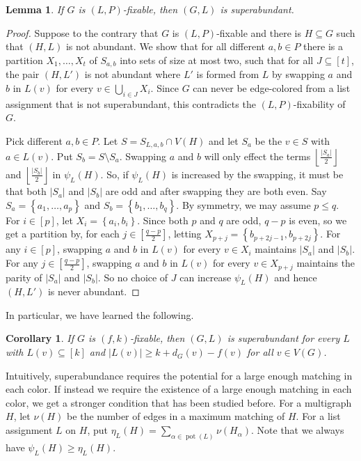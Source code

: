 \documentclass[12pt]{article}
\theoremstyle{plain}
\newtheorem{lem}[thm]{Lemma}
\newtheorem{cor}[thm]{Corollary}
\theoremstyle{definition}
\theoremstyle{remark}
\newcommand{\set}[1]{\left\{ #1 \right\}}
\newcommand{\card}[1]{\left|#1\right|}
\newcommand{\floor}[1]{\left\lfloor#1\right\rfloor}
\newcommand{\irange}[1]{\left[#1\right]}
\newcommand{\pot}{\operatorname{pot}}
\begin{document}
\begin{lem}\label{SuperabundanceIsNecessary}
If $G$ is $(L, P)$-fixable, then $(G, L)$ is superabundant.
\end{lem}
\begin{proof}
Suppose to the contrary that $G$ is $(L, P)$-fixable and there is $H \subseteq G$ such that $(H, L)$ is not abundant. We show that for all different $a,b \in P$ there is a partition $X_1, \ldots, X_t$ of $S_{a,b}$ into sets of size at most two, such that for all $J \subseteq \irange{t}$, the pair $(H,L')$ is not abundant where $L'$ is formed from $L$ by swapping $a$ and $b$ in $L(v)$ for every $v \in \bigcup_{i \in J} X_i$.  Since $G$ can never be edge-colored from a list assignment that is not superabundant, this contradicts the $(L,P)$-fixability of $G$.

Pick different $a,b \in P$.  Let $S = S_{L,a,b} \cap V(H)$ and let $S_a$ be the $v \in S$ with $a \in L(v)$.  Put $S_b = S\setminus S_a$.  Swapping $a$ and $b$ will only effect the terms $\floor{\frac{\card{S_a}}{2}}$ and $\floor{\frac{\card{S_b}}{2}}$ in $\psi_L(H)$.  So, if $\psi_L(H)$ is increased by the swapping, it must be that both $|S_a|$ and $|S_b|$ are odd and after swapping they are both even.  Say $S_a = \set{a_1, \ldots,a_p}$ and $S_b = \set{b_1, \ldots,b_q}$.  By symmetry, we may assume $p \le q$.  For $i \in \irange{p}$, let $X_i = \set{a_i, b_i}$.  Since both $p$ and $q$ are odd, $q-p$ is even, so we get a partition by, for each $j \in \irange{\frac{q-p}{2}}$, letting $X_{p + j} = \set{b_{p + 2j - 1}, b_{p + 2j}}$.  For any $i \in \irange{p}$, swapping $a$ and $b$ in $L(v)$ for every $v \in X_i$ maintains $|S_a|$ and $|S_b|$.  For any $j \in \irange{\frac{q-p}{2}}$, swapping $a$ and $b$ in $L(v)$ for every $v \in X_{p+j}$ maintains the parity of $|S_a|$ and $|S_b|$.  So no choice of $J$ can increase $\psi_L(H)$ and hence $(H,L')$ is never abundant.
\end{proof}

In particular, we have learned the following.

\begin{cor}
	If $G$ is $(f,k)$-fixable, then $(G,L)$ is superabundant for every $L$ with $L(v) \subseteq \irange{k}$ and $|L(v)| \ge k + d_{G}(v) - f(v)$ for all $v \in V(G)$.
\end{cor}

Intuitively, superabundance requires the potential for a large enough matching in each color. If instead we require the existence of a large enough matching in each color, we get a stronger condition that has been studied before. For a multigraph $H$, let $\nu(H)$ be the number of edges in a maximum matching of $H$. 
For a list assignment $L$ on $H$, put $\eta_L(H) = \sum_{\alpha \in \pot(L)} \nu(H_\alpha)$.  Note that we always have $\psi_L(H) \ge \eta_L(H)$.
\end{document}
